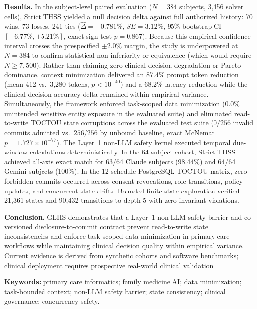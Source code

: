 \documentclass[11pt]{article}
\begin{document}
\textbf{Results.} In the subject-level paired evaluation ($N=384$ subjects, 3,456 solver cells), Strict THSS yielded a null decision delta against full authorized history: 70 wins, 73 losses, 241 ties ($\hat{\Delta} = -0.781\%$, $SE=3.12\%$, 95\% bootstrap CI $[-6.77\%, +5.21\%]$, exact sign test $p=0.867$). Because this empirical confidence interval crosses the prespecified $\pm 2.0\%$ margin, the study is underpowered at $N=384$ to confirm statistical non-inferiority or equivalence (which would require $N \ge 7{,}500$). Rather than claiming zero clinical decision degradation or Pareto dominance, context minimization delivered an 87.4\% prompt token reduction (mean 412 vs.\ 3,280 tokens, $p < 10^{-40}$) and a 68.2\% latency reduction while the clinical decision accuracy delta remained within empirical variance. Simultaneously, the framework enforced task-scoped data minimization (0.0\% unintended sensitive entity exposure in the evaluated suite) and eliminated read-to-write TOCTOU state corruptions across the evaluated test suite ($0/256$ invalid commits admitted vs.\ $256/256$ by unbound baseline, exact McNemar $p = 1.727 \times 10^{-77}$). The Layer~1 non-LLM safety kernel executed temporal due-window calculations deterministically. In the 64-subject cohort, Strict THSS achieved all-axis exact match for 63/64 Claude subjects (98.44\%) and 64/64 Gemini subjects (100\%). In the 12-schedule PostgreSQL TOCTOU matrix, zero forbidden commits occurred across consent revocations, role transitions, policy updates, and concurrent state drifts. Bounded finite-state exploration verified 21,361 states and 90,432 transitions to depth 5 with zero invariant violations.

\textbf{Conclusion.} GLHS demonstrates that a Layer~1 non-LLM safety barrier and co-versioned disclosure-to-commit contract prevent read-to-write state inconsistencies and enforce task-scoped data minimization in primary care workflows while maintaining clinical decision quality within empirical variance. Current evidence is derived from synthetic cohorts and software benchmarks; clinical deployment requires prospective real-world clinical validation.

\textbf{Keywords:} primary care informatics; family medicine AI; data minimization; task-bounded context; non-LLM safety barrier; state consistency; clinical governance; concurrency safety.
\end{document}
